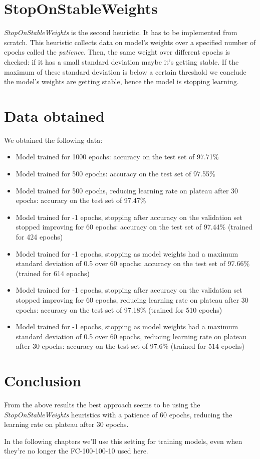 \section{StopOnStableWeights}
\emph{StopOnStableWeights} is the second heuristic. It has to be
implemented from scratch. This heuristic collects data on model's
weights over a specified number of epochs called the \emph{patience}.
Then, the same weight over different epochs is checked: if it has a
small standard deviation maybe it's getting stable. If the maximum of
these standard deviation is below a certain threshold we conclude the
model's weights are getting stable, hence the model is stopping
learning.

\section{Data obtained}
We obtained the following data:
\begin{itemize}
\item
  Model trained for 1000 epochs: accuracy on the test set of 97.71\%
\item
  Model trained for 500 epochs: accuracy on the test set of 97.55\%
\item
  Model trained for 500 epochs, reducing learning rate on plateau after
  30 epochs: accuracy on the test set of 97.47\%
\item
  Model trained for -1 epochs, stopping after accuracy on the
  validation set stopped improving for 60 epochs: accuracy on the test
  set of 97.44\% (trained for 424 epochs)
\item
  Model trained for -1 epochs, stopping as model weights had a maximum
  standard deviation of 0.5 over 60 epochs: accuracy on the test set of
  97.66\% (trained for 614 epochs)
\item
  Model trained for -1 epochs, stopping after accuracy on the
  validation set stopped improving for 60 epochs, reducing learning
  rate on plateau after 30 epochs: accuracy on the test
  set of 97.18\% (trained for 510 epochs)
\item
  Model trained for -1 epochs, stopping as model weights had a maximum
  standard deviation of 0.5 over 60 epochs, reducing learning
  rate on plateau after 30 epochs: accuracy on the test set of
  97.6\% (trained for 514 epochs)
\end{itemize}

\section{Conclusion}
From the above results the best approach seems to be using the
\emph{StopOnStableWeights} heuristics with a patience of 60 epochs,
reducing the learning rate on plateau after 30 epochs.

In the following chapters we'll use this setting for training models,
even when they're no longer the FC-100-100-10 used here.

